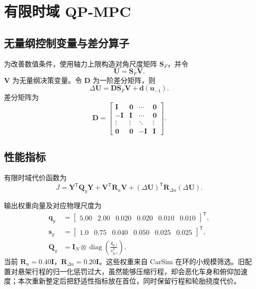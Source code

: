 \documentclass[UTF8,12pt,a4paper,fontset=windows]{ctexart}
\newcommand{\vect}[1]{\bm{#1}}
\newcommand{\trans}{^{\mathsf T}}
\newcommand{\diag}{\operatorname{diag}}
\begin{document}
\section{有限时域 QP-MPC}

\subsection{无量纲控制变量与差分算子}

为改善数值条件，使用轴力上限构造对角尺度矩阵 $\vect{S}_F$，并令
\begin{equation}
\vect{U}=\vect{S}_F\vect{V}.
\end{equation}
$\vect{V}$ 为无量纲决策变量。令 $\vect{D}$ 为一阶差分矩阵，则
\begin{equation}
\Delta\vect{U}=\vect{D}\vect{S}_F\vect{V}+\vect{d}(\vect{u}_{-1}).
\end{equation}
差分矩阵为
\begin{equation}
\vect{D}=\begin{bmatrix}
\vect{I} & \vect{0} & \cdots & \vect{0}\\
-\vect{I} & \vect{I} & \cdots & \vect{0}\\
\vdots & \vdots & \ddots & \vdots\\
\vect{0} & \vect{0} & -\vect{I} & \vect{I}
\end{bmatrix}.
\end{equation}

\subsection{性能指标}

有限时域代价函数为
\begin{equation}
J=\vect{Y}\trans\vect{Q}_y\vect{Y}
+\vect{V}\trans\vect{R}_u\vect{V}
+(\Delta\vect{U})\trans\vect{R}_{\Delta u}(\Delta\vect{U}).
\end{equation}

输出权重向量及对应物理尺度为
\begin{align}
\vect{q}_y&=\begin{bmatrix}5.00&2.00&0.020&0.020&0.010&0.010\end{bmatrix}\trans,\\
\vect{s}_y&=\begin{bmatrix}1.0&0.75&0.040&0.050&0.025&0.025\end{bmatrix}\trans,\\
\vect{Q}_y&=\vect{I}_N\otimes\diag\!\left(\frac{q_{y,i}}{s_{y,i}^2}\right).
\end{align}
当前 $\vect{R}_u=0.40\vect{I}$，$\vect{R}_{\Delta u}=0.20\vect{I}$。这些权重来自 CarSim 在环的小规模筛选。旧配置对悬架行程的归一化惩罚过大，虽然能够压缩行程，却会恶化车身和俯仰加速度；本次重新整定后把舒适性指标放在首位，同时保留行程和轮胎挠度代价。
\end{document}
